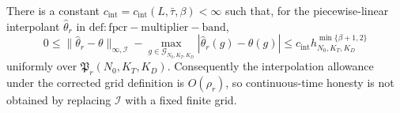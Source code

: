 There is a constant \(c_{\mathrm{int}}=c_{\mathrm{int}}(L,\bar\tau,\beta)<\infty\) such that, for the piecewise-linear interpolant \(\widehat\theta_r\) in \(\mathrm{def:fpcr-multiplier-band}\),
\[
 0\le \|\widehat\theta_r-\theta\|_{\infty,\mathcal I}
 -\max_{g\in\mathcal G_{N_0,K_T,K_D}}|\widehat\theta_r(g)-\theta(g)|
 \le c_{\mathrm{int}}h_{N_0,K_T,K_D}^{\min\{\beta+1,2\}}
\]
uniformly over \(\mathfrak P_r(N_0,K_T,K_D)\). Consequently the interpolation allowance under the corrected grid definition is \(O(\rho_r)\), so continuous-time honesty is not obtained by replacing \(\mathcal I\) with a fixed finite grid.